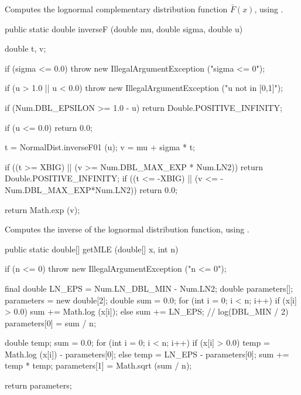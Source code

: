  \begin{tabb}
  Computes the lognormal complementary distribution function $\bar{F}(x)$,
  using .
 \end{tabb}
\begin{code}

   public static double inverseF (double mu, double sigma, double u)\begin{hide} {
        double t, v;

        if (sigma <= 0.0)
            throw new IllegalArgumentException ("sigma  <= 0");

        if (u > 1.0 || u < 0.0)
            throw new IllegalArgumentException ("u not in [0,1]");

        if (Num.DBL_EPSILON >= 1.0 - u)
            return Double.POSITIVE_INFINITY;

        if (u <= 0.0)
            return 0.0;

        t = NormalDist.inverseF01 (u);
        v = mu + sigma * t;

        if ((t >= XBIG) || (v >= Num.DBL_MAX_EXP * Num.LN2))
            return Double.POSITIVE_INFINITY;
        if ((t <= -XBIG) || (v <= -Num.DBL_MAX_EXP*Num.LN2))
            return 0.0;

        return Math.exp (v);
   }\end{hide}
\end{code}
  \begin{tabb}
  Computes the inverse of the lognormal distribution function,
  using .
 \end{tabb}
\begin{code}

   public static double[] getMLE (double[] x, int n)\begin{hide} {
      if (n <= 0)
         throw new IllegalArgumentException ("n <= 0");

      final double LN_EPS = Num.LN_DBL_MIN - Num.LN2;
      double parameters[];
      parameters = new double[2];
      double sum = 0.0;
      for (int i = 0; i < n; i++) {
         if (x[i] > 0.0)
            sum += Math.log (x[i]);
         else
            sum += LN_EPS;       // log(DBL_MIN / 2)
      }
      parameters[0] = sum / n;

      double temp;
      sum = 0.0;
      for (int i = 0; i < n; i++) {
         if (x[i] > 0.0)
            temp = Math.log (x[i]) - parameters[0];
         else
            temp = LN_EPS - parameters[0];
         sum += temp * temp;
      }
      parameters[1] = Math.sqrt (sum / n);

      return parameters;
   }\end{hide}
\end{code}
